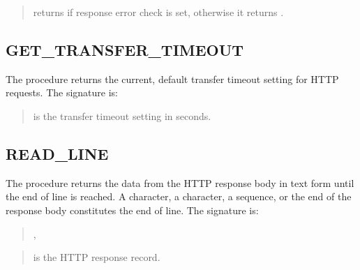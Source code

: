 \documentclass[letterpaper,10pt,english,openany,oneside]{sphinxmanual}
\begin{document}

\begin{quote}

 returns  if response error check is set, otherwise it
returns .
\end{quote}


\subsection{GET\_TRANSFER\_TIMEOUT}
\label{\detokenize{utl_http:get-transfer-timeout}}
The  procedure returns the current, default
transfer timeout setting for HTTP requests. The signature is:
\begin{quote}

\end{quote}


\begin{quote}

 is the transfer timeout setting in seconds.
\end{quote}

\newpage


\subsection{READ\_LINE}
\label{\detokenize{utl_http:read-line}}
The  procedure returns the data from the HTTP response body in
text form until the end of line is reached. A  character, a 
character, a  sequence, or the end of the response body constitutes
the end of line. The signature is:
\begin{quote}

,
\end{quote}


\begin{quote}

 is the HTTP response record.
\end{quote}
\end{document}
